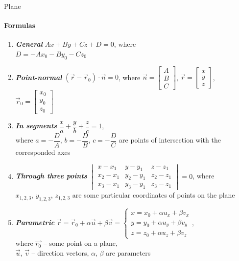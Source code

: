\documentclass[aspectratio=169]{beamer}
\begin{document}
\begin{frame}[t]{Plane}
    \framesubtitle{Formulas}
    \scriptsize
    \vspace{-0.4cm}
    \begin{multicols}{2}
        \begin{enumerate}
            \item \textbf{\textit{General}} $Ax + By + Cz + D = 0$, where \\ $D = -Ax_0 - By_0 - Cz_0$
            \item \textbf{\textit{Point-normal}} $(\vec{r} - \vec{r}_0) \cdot \vec{n} = 0$, where $\vec{n} = \begin{bmatrix}A\\B\\C \end{bmatrix}$, $\vec{r} = \begin{bmatrix}x\\y\\z \end{bmatrix}$, $\vec{r}_0 = \begin{bmatrix}x_0\\y_0\\z_0 \end{bmatrix}$
            \item \textbf{\textit{In segments}} $\dfrac{x}{a} + \dfrac{y}{b} + \dfrac{z}{c} = 1$, \smallskip\\ where $a=-\dfrac{D}{A}$, $b=-\dfrac{D}{B}$, $c=-\dfrac{D}{C}$ are points of intersection with the corresponded axes
            \item \textbf{\textit{Through three points}} $\begin{vmatrix}
                          x-x_1   & y-y_1   & z-z_1   \\
                          x_2-x_1 & y_2-y_1 & z_2-z_1 \\
                          x_3-x_1 & y_3-y_1 & z_3-z_1
                      \end{vmatrix} = 0 $, where \\ $x_{1,2,3}$, $y_{1,2,3}$, $z_{1,2,3}$ are some particular coordinates of points on the plane
            \item \textbf{\textit{Parametric}} $\vec{r} = \vec{r}_0 + \alpha \vec{u} + \beta \vec{v} = \left\{\begin{matrix} x = x_0 + \alpha u_x + \beta v_x
                          \\ y = y_0 + \alpha u_y + \beta v_y \\ z = z_0 + \alpha u_z + \beta v_z
                      \end{matrix}\right. $, \\where $\vec{r_0}$ -- some point on a plane,\\ $\vec{u}$, $\vec{v}$ -- direction vectors, $\alpha$, $\beta$ are parameters
        \end{enumerate}
    \end{multicols}
\end{frame}
\end{document}
